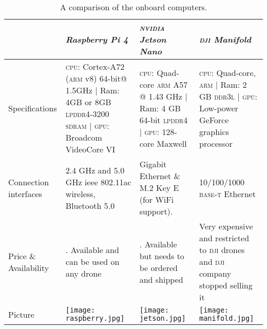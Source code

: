 \documentclass[../main.tex]{subfiles}
\begin{document}
\begin{table}[H]
	\centering
	\caption{A comparison of the onboard computers.}
	\label{tab:onboard-computers}  
	\begin{tabular}{ p{3cm} p{4cm} p{4cm} p{4cm} }
		\toprule
		\textit{} & \textit{Raspberry Pi 4} & \textit{\textsc{nvidia} Jetson Nano} & 
		\textit{\textsc{dji} Manifold}\\ \midrule
		Specifications  & \textsc{cpu}: Cortex-A72 (\textsc{arm} v8) 64-bit@ 1.5GHz | Ram: 4GB or 8GB \textsc{lpddr4}-3200 \textsc{sdram} | \textsc{gpu}: Broadcom VideoCore VI & 
		\textsc{cpu}: Quad-core \textsc{arm} A57 @ 1.43 GHz | Ram: 4 GB 64-bit 
		\textsc{lpddr4}   | \textsc{gpu}: 128-core Maxwell & \textsc{cpu}: Quad-core, 
		\textsc{arm} | Ram: 2 GB \textsc{ddr3l} | \textsc{gpu}: Low-power GeForce
		 graphics processor \\ \addlinespace
		Connection interfaces & 2.4 GHz and 5.0 GHz \gls{ieee} 802.11ac wireless,
		 Bluetooth 5.0 & Gigabit Ethernet \& M.2 Key E (for WiFi support). &10/100/1000 
		 \textsc{base-t} Ethernet \\ \addlinespace
		
		Price \& Availability & \qar{300}. Available and can be used on any drone & 
		\qar{400}. Available but needs to be ordered and shipped & Very expensive 
		and restricted to \textsc{dji} drones and \textsc{dji} company stopped 
		selling it \\ \addlinespace
		Picture & \begin{minipage}{.2\textwidth}
			\texttt{[image: raspberry.jpg]}
		\end{minipage}  & \begin{minipage}{.2\textwidth}
			\texttt{[image: jetson.jpg]}
		\end{minipage} & \begin{minipage}{.2\textwidth}
			\texttt{[image: manifold.jpg]}
		\end{minipage} \\
		\bottomrule
	\end{tabular}
\end{table}
\end{document}
